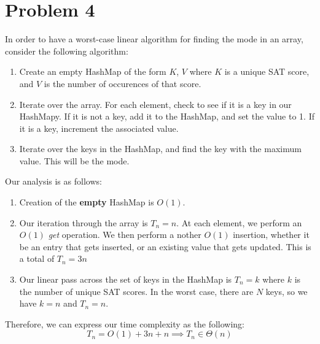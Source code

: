 \section*{Problem 4}
In order to have a worst-case linear algorithm for finding the mode in an array, consider the following algorithm:
\begin{enumerate}
    \item Create an empty HashMap of the form $K$, $V$ where $K$ is a 
    unique SAT score, and $V$ is the number of occurences of that score.
    \item Iterate over the array. For each element, check to see if it
          is a key in our HashMapy.
        \subitem If it is not a key, add it to the HashMap, and set the
                 value to 1.
        \subitem If it is a key, increment the associated value.
    \item Iterate over the keys in the HashMap, and find the key with
          the maximum value. This will be the mode. 
\end{enumerate}

Our analysis is as follows:\\
\begin{enumerate}
    \item Creation of the \textbf{empty} HashMap is $O(1)$.
    \item Our iteration through the array is $T_n = n$. At each element,
          we perform an $O(1)$ \textit{get} operation. We then perform a
          nother $O(1)$ insertion, whether it be an entry that gets 
          inserted, or an existing value that gets updated. This is a 
          total of $T_n = 3n$
    \item Our linear pass across the set of keys in the HashMap is
          $T_n = k$ where $k$ is the number of unique SAT scores. In 
          the worst case, there are $N$ keys, so we have $k = n$ 
          and $T_n = n$.
\end{enumerate}
Therefore, we can express our time complexity as the following:
\\
$$
    T_n = O(1) + 3n + n \implies T_n \in \Theta(n)
$$
